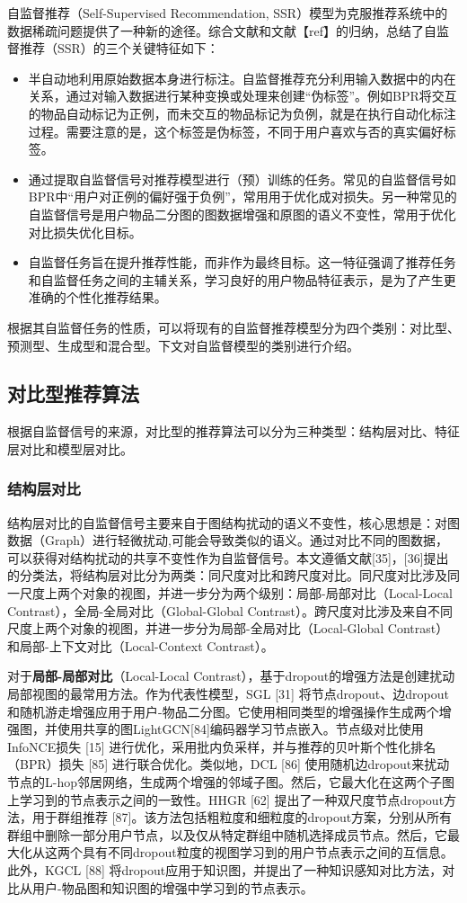 自监督推荐（Self-Supervised  Recommendation,  SSR）模型为克服推荐系统中的数据稀疏问题提供了一种新的途径。综合文献\cite{Liu:2021:TKDE}和文献【ref】的归纳，总结了自监督推荐（SSR）的三个关键特征如下：
\begin{itemize}
\item 半自动地利用原始数据本身进行标注。自监督推荐充分利用输入数据中的内在关系，通过对输入数据进行某种变换或处理来创建“伪标签”。例如BPR\cite{Steffen:2009:UAI}将交互的物品自动标记为正例，而未交互的物品标记为负例，就是在执行自动化标注过程。需要注意的是，这个标签是伪标签，不同于用户喜欢与否的真实偏好标签。

\item 通过提取自监督信号对推荐模型进行（预）训练的任务。常见的自监督信号如BPR中“用户对正例的偏好强于负例”，常用用于优化成对损失。另一种常见的自监督信号是用户物品二分图的图数据增强和原图的语义不变性，常用于优化对比损失优化目标。

\item 自监督任务旨在提升推荐性能，而非作为最终目标。这一特征强调了推荐任务和自监督任务之间的主辅关系，学习良好的用户物品特征表示，是为了产生更准确的个性化推荐结果。
\end{itemize}

根据其自监督任务的性质，可以将现有的自监督推荐模型分为四个类别：对比型、预测型、生成型和混合型。下文对自监督模型的类别进行介绍。
\subsection{对比型推荐算法}
根据自监督信号的来源，对比型的推荐算法可以分为三种类型：结构层对比、特征层对比和模型层对比。
\subsubsection{结构层对比}
结构层对比的自监督信号主要来自于图结构扰动的语义不变性，核心思想是：对图数据（Graph）进行轻微扰动,可能会导致类似的语义。通过对比不同的图数据，可以获得对结构扰动的共享不变性作为自监督信号。本文遵循文献[35]，[36]提出的分类法，将结构层对比分为两类：同尺度对比和跨尺度对比。同尺度对比涉及同一尺度上两个对象的视图，并进一步分为两个级别：局部-局部对比（Local-Local Contrast），全局-全局对比（Global-Global Contrast）。跨尺度对比涉及来自不同尺度上两个对象的视图，并进一步分为局部-全局对比（Local-Global Contrast）和局部-上下文对比（Local-Context Contrast）。

对于\textbf{局部-局部对比}（Local-Local Contrast），基于dropout的增强方法是创建扰动局部视图的最常用方法。作为代表性模型，SGL [31] 将节点dropout、边dropout和随机游走增强应用于用户-物品二分图。它使用相同类型的增强操作生成两个增强图，并使用共享的图LightGCN[84]编码器学习节点嵌入。节点级对比使用InfoNCE损失 [15] 进行优化，采用批内负采样，并与推荐的贝叶斯个性化排名（BPR）损失 [85] 进行联合优化。类似地，DCL [86] 使用随机边dropout来扰动节点的L-hop邻居网络，生成两个增强的邻域子图。然后，它最大化在这两个子图上学习到的节点表示之间的一致性。HHGR [62] 提出了一种双尺度节点dropout方法，用于群组推荐 [87]。该方法包括粗粒度和细粒度的dropout方案，分别从所有群组中删除一部分用户节点，以及仅从特定群组中随机选择成员节点。然后，它最大化从这两个具有不同dropout粒度的视图学习到的用户节点表示之间的互信息。此外，KGCL [88] 将dropout应用于知识图，并提出了一种知识感知对比方法，对比从用户-物品图和知识图的增强中学习到的节点表示。

